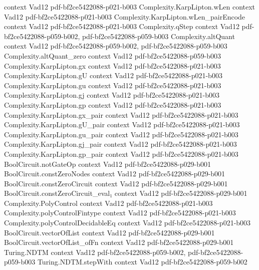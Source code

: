 \begin{theorem}
  {context}
  {Vad12}
  {pdf-bf2ce5422088-p021-b003}
\proofstep
  {Complexity.KarpLipton.wLen}
  {context}
  {Vad12}
  {pdf-bf2ce5422088-p021-b003}
\proofstep
  {Complexity.KarpLipton.wLen_pairEncode}
  {context}
  {Vad12}
  {pdf-bf2ce5422088-p021-b003}
\proofstep
  {Complexity.qStep}
  {context}
  {Vad12}
  {pdf-bf2ce5422088-p059-b002,
    pdf-bf2ce5422088-p059-b003}
\proofstep
  {Complexity.altQuant}
  {context}
  {Vad12}
  {pdf-bf2ce5422088-p059-b002,
    pdf-bf2ce5422088-p059-b003}
\proofstep
  {Complexity.altQuant_zero}
  {context}
  {Vad12}
  {pdf-bf2ce5422088-p059-b003}
\proofstep
  {Complexity.KarpLipton.gx}
  {context}
  {Vad12}
  {pdf-bf2ce5422088-p021-b003}
\proofstep
  {Complexity.KarpLipton.gU}
  {context}
  {Vad12}
  {pdf-bf2ce5422088-p021-b003}
\proofstep
  {Complexity.KarpLipton.gu}
  {context}
  {Vad12}
  {pdf-bf2ce5422088-p021-b003}
\proofstep
  {Complexity.KarpLipton.gj}
  {context}
  {Vad12}
  {pdf-bf2ce5422088-p021-b003}
\proofstep
  {Complexity.KarpLipton.gp}
  {context}
  {Vad12}
  {pdf-bf2ce5422088-p021-b003}
\proofstep
  {Complexity.KarpLipton.gx_pair}
  {context}
  {Vad12}
  {pdf-bf2ce5422088-p021-b003}
\proofstep
  {Complexity.KarpLipton.gU_pair}
  {context}
  {Vad12}
  {pdf-bf2ce5422088-p021-b003}
\proofstep
  {Complexity.KarpLipton.gu_pair}
  {context}
  {Vad12}
  {pdf-bf2ce5422088-p021-b003}
\proofstep
  {Complexity.KarpLipton.gj_pair}
  {context}
  {Vad12}
  {pdf-bf2ce5422088-p021-b003}
\proofstep
  {Complexity.KarpLipton.gp_pair}
  {context}
  {Vad12}
  {pdf-bf2ce5422088-p021-b003}
\proofstep
  {BoolCircuit.notGateOp}
  {context}
  {Vad12}
  {pdf-bf2ce5422088-p029-b001}
\proofstep
  {BoolCircuit.constZeroNodes}
  {context}
  {Vad12}
  {pdf-bf2ce5422088-p029-b001}
\proofstep
  {BoolCircuit.constZeroCircuit}
  {context}
  {Vad12}
  {pdf-bf2ce5422088-p029-b001}
\proofstep
  {BoolCircuit.constZeroCircuit_eval₁}
  {context}
  {Vad12}
  {pdf-bf2ce5422088-p029-b001}
\proofstep
  {Complexity.PolyControl}
  {context}
  {Vad12}
  {pdf-bf2ce5422088-p021-b003}
\proofstep
  {Complexity.polyControlFintype}
  {context}
  {Vad12}
  {pdf-bf2ce5422088-p021-b003}
\proofstep
  {Complexity.polyControlDecidableEq}
  {context}
  {Vad12}
  {pdf-bf2ce5422088-p021-b003}
\proofstep
  {BoolCircuit.vectorOfList}
  {context}
  {Vad12}
  {pdf-bf2ce5422088-p029-b001}
\proofstep
  {BoolCircuit.vectorOfList_ofFn}
  {context}
  {Vad12}
  {pdf-bf2ce5422088-p029-b001}
\proofstep
  {Turing.NDTM}
  {context}
  {Vad12}
  {pdf-bf2ce5422088-p059-b002,
    pdf-bf2ce5422088-p059-b003}
\proofstep
  {Turing.NDTM.stepWith}
  {context}
  {Vad12}
  {pdf-bf2ce5422088-p059-b002}

\end{theorem}

